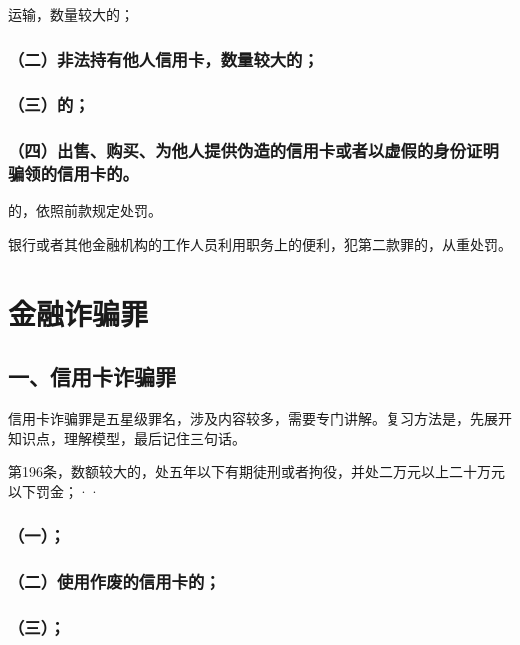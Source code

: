 运输，数量较大的；

\subsubsection*{（二）非法持有他人信用卡，数量较大的；}

\subsubsection*{（三）的；}

\subsubsection*{（四）出售、购买、为他人提供伪造的信用卡或者以虚假的身份证明骗领的信用卡的。}

的，依照前款规定处罚。

银行或者其他金融机构的工作人员利用职务上的便利，犯第二款罪的，从重处罚。

\section{金融诈骗罪}

\subsection*{一、信用卡诈骗罪}

信用卡诈骗罪是五星级罪名，涉及内容较多，需要专门讲解。复习方法是，先展开知识点，理解模型，最后记住三句话。

第196条，数额较大的，处五年以下有期徒刑或者拘役，并处二万元以上二十万元以下罚金；··

\subsubsection*{（一）；}

\subsubsection*{（二）使用作废的信用卡的；}

\subsubsection*{（三）；}

